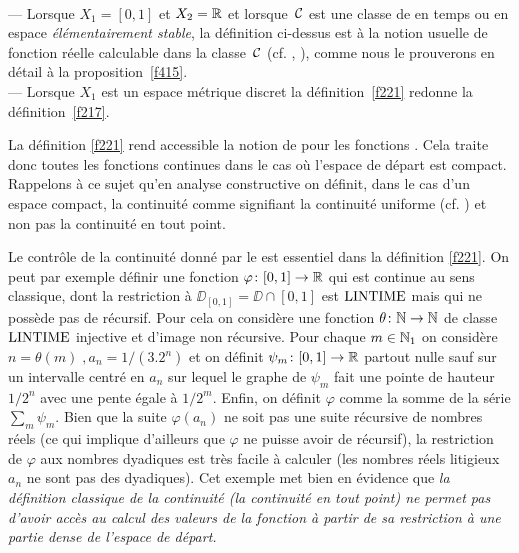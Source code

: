 \begin{fexamples}\label{f223}~\\
--- Lorsque  $X_1 = [0,1]$ et $X_2 = \mathbb {R}$  et lorsque~${{\cal C}}$    est une classe 
de \com en temps ou en espace {\em élémentairement stable}, la définition 
ci-dessus est \equiva à la notion usuelle de fonction réelle calculable dans 
la classe~${{\cal C}}$  (cf. \cite{fKF82}, \cite{fKo91}), comme nous le prouverons en 
détail à la proposition~\ref{f415}.\\
--- Lorsque  $X_1$ est un espace métrique discret la définition~\ref{f221} 
redonne la définition~\ref{f217}. 
\end{fexamples}
La définition \ref{f221} rend accessible la notion de \com pour les fonctions 
\unicos. Cela traite donc toutes les fonctions continues dans le cas où 
l'espace de départ est compact. Rappelons à ce sujet qu'en analyse 
constructive on définit, dans le cas d'un espace compact, la continuité 
comme signifiant la continuité uniforme (cf. \cite{fBB}) et non pas la 
continuité en tout point. 

\begin{fremark}\label{f224} 
Le contrôle de la continuité donné par le \mcu est essentiel dans la 
définition \ref{f221}. On peut par exemple définir une fonction  $\varphi \colon [0,1] \rightarrow \mathbb {R}$  qui est continue au sens classique, dont la restriction 
à  $\DD_{[0,1]} = \DD\cap [0,1]$  est ${\rm LINTIME}$  mais qui ne possède pas de 
\mcu récursif. Pour cela on considère une fonction  $\theta \colon  \mathbb {N} 
\rightarrow \mathbb {N}$  de classe ${\rm LINTIME} $ injective et d'image non récursive. Pour 
chaque $m \in \mathbb {N}_1$ on considère  $n = \theta(m)\; , a_n = 1/(3.2^n)$  et on 
définit  $\psi_m \colon  [0,1] \rightarrow\mathbb {R}$  partout nulle sauf sur un 
intervalle centré en   $a_n$  sur lequel le graphe de  $\psi_m$  fait une 
pointe de hauteur  $1/2^n$  avec une pente égale à  $1/2^m$.  Enfin, on 
définit  $\varphi$  comme la somme de la série  $\sum_m \psi_m$.  Bien que 
la suite  $\varphi(a_n)$  ne soit pas une suite récursive de nombres réels 
(ce qui implique d'ailleurs que $\varphi$ ne puisse avoir de \mcu récursif), 
la restriction de $\varphi$ aux nombres dyadiques est très facile à calculer  
(les nombres réels litigieux  $a_n$  ne sont pas des dyadiques). Cet exemple 
met bien en évidence que {\em la définition classique de la continuité (la 
continuité en tout point) ne permet pas d'avoir accès au calcul des valeurs 
de la fonction à partir de sa restriction à une partie dense de l'espace de 
départ.}
\end{fremark}

